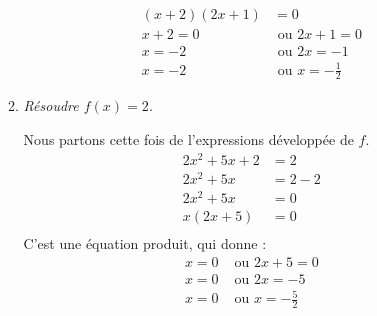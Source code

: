 \documentclass[12pt]{article}
\begin{document}
\begin{exercice}
\begin{enumerate}[(1)]
\begin{enumerate}
\begin{align*}
            \left( x+2 \right)\left( 2x+1 \right) &=0\\
            x+2=0 &\text{ ou } 2x+1=0\\
            x=-2 &\text{ ou } 2x=-1\\
            x=-2 &\text{ ou } x=-\frac{1}{2}
          \end{align*}
        \item \emph{Résoudre $f(x)=2$.}
          \setlength{\columnseprule}{1pt}
          \begin{multicols}{2}
            Nous partons cette fois de l'expressions développée de $f$.
          \begin{align*}
            2x^2+5x+2 &= 2\\
            2x^2+5x &= 2-2\\
            2x^2+5x &= 0\\
            x\left( 2x+5 \right) &=0\\
          \end{align*}
          C'est une équation produit, qui donne :
          \begin{align*}
            x=0 &\text{ ou } 2x+5=0\\
            x=0 &\text{ ou } 2x=-5\\
            x=0 &\text{ ou } x=-\frac{5}{2}
          \end{align*}
    \end{multicols}
      \end{enumerate}
  \end{enumerate}
\end{exercice}
\end{document}
